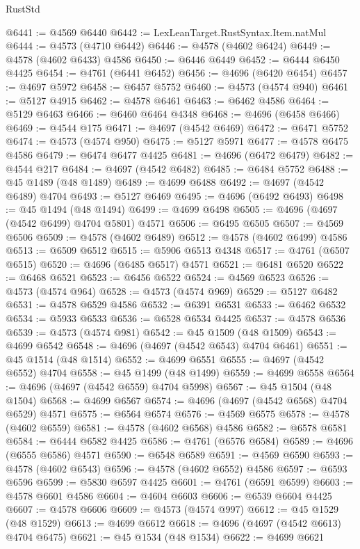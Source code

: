 \begin{lexlean}{RustStd}
\begin{coremodule}
@6441 := @4569 @6440
@6442 := LexLeanTarget.RustSyntax.Item.natMul
@6444 := @4573 (@4710 @6442)
@6446 := @4578 (@4602 @6424)
@6449 := @4578 (@4602 @6433) @4586
@6450 := @6446 @6449
@6452 := @6444 @6450 @4425
@6454 := @4761 (@6441 @6452)
@6456 := @4696 (@6420 @6454)
@6457 := @4697 @5972
@6458 := @6457 @5752
@6460 := @4573 (@4574 @940)
@6461 := @5127 @4915
@6462 := @4578 @6461
@6463 := @6462 @4586
@6464 := @5129 @6463
@6466 := @6460 @6464 @4348
@6468 := @4696 (@6458 @6466)
@6469 := @4544 @175
@6471 := @4697 (@4542 @6469)
@6472 := @6471 @5752
@6474 := @4573 (@4574 @950)
@6475 := @5127 @5971
@6477 := @4578 @6475 @4586
@6479 := @6474 @6477 @4425
@6481 := @4696 (@6472 @6479)
@6482 := @4544 @217
@6484 := @4697 (@4542 @6482)
@6485 := @6484 @5752
@6488 := @45 @1489 (@48 @1489)
@6489 := @4699 @6488
@6492 := @4697 (@4542 @6489) @4704
@6493 := @5127 @6469
@6495 := @4696 (@6492 @6493)
@6498 := @45 @1494 (@48 @1494)
@6499 := @4699 @6498
@6505 := @4696 (@4697 (@4542 @6499) @4704 @5801) @4571
@6506 := @6495 @6505
@6507 := @4569 @6506
@6509 := @4578 (@4602 @6489)
@6512 := @4578 (@4602 @6499) @4586
@6513 := @6509 @6512
@6515 := @5906 @6513 @4348
@6517 := @4761 (@6507 @6515)
@6520 := @4696 (@6485 @6517) @4571
@6521 := @6481 @6520
@6522 := @6468 @6521
@6523 := @6456 @6522
@6524 := @4569 @6523
@6526 := @4573 (@4574 @964)
@6528 := @4573 (@4574 @969)
@6529 := @5127 @6482
@6531 := @4578 @6529 @4586
@6532 := @6391 @6531
@6533 := @6462 @6532
@6534 := @5933 @6533
@6536 := @6528 @6534 @4425
@6537 := @4578 @6536
@6539 := @4573 (@4574 @981)
@6542 := @45 @1509 (@48 @1509)
@6543 := @4699 @6542
@6548 := @4696 (@4697 (@4542 @6543) @4704 @6461)
@6551 := @45 @1514 (@48 @1514)
@6552 := @4699 @6551
@6555 := @4697 (@4542 @6552) @4704
@6558 := @45 @1499 (@48 @1499)
@6559 := @4699 @6558
@6564 := @4696 (@4697 (@4542 @6559) @4704 @5998)
@6567 := @45 @1504 (@48 @1504)
@6568 := @4699 @6567
@6574 := @4696 (@4697 (@4542 @6568) @4704 @6529) @4571
@6575 := @6564 @6574
@6576 := @4569 @6575
@6578 := @4578 (@4602 @6559)
@6581 := @4578 (@4602 @6568) @4586
@6582 := @6578 @6581
@6584 := @6444 @6582 @4425
@6586 := @4761 (@6576 @6584)
@6589 := @4696 (@6555 @6586) @4571
@6590 := @6548 @6589
@6591 := @4569 @6590
@6593 := @4578 (@4602 @6543)
@6596 := @4578 (@4602 @6552) @4586
@6597 := @6593 @6596
@6599 := @5830 @6597 @4425
@6601 := @4761 (@6591 @6599)
@6603 := @4578 @6601 @4586
@6604 := @4604 @6603
@6606 := @6539 @6604 @4425
@6607 := @4578 @6606
@6609 := @4573 (@4574 @997)
@6612 := @45 @1529 (@48 @1529)
@6613 := @4699 @6612
@6618 := @4696 (@4697 (@4542 @6613) @4704 @6475)
@6621 := @45 @1534 (@48 @1534)
@6622 := @4699 @6621

\end{coremodule}
\end{lexlean}
